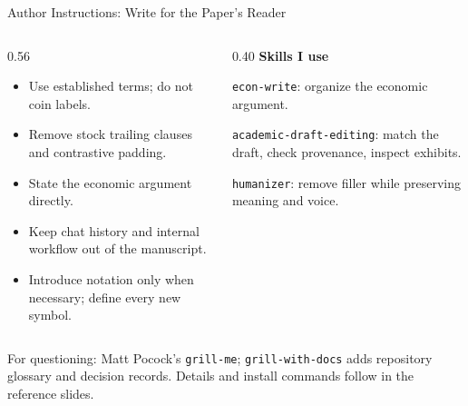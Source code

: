 \begin{frame}{Author Instructions: Write for the Paper's Reader}
\begin{columns}[t]
\begin{column}{0.56\textwidth}
\begin{itemize}\setlength{\itemsep}{0.15cm}
\item Use established terms; do not coin labels.
\item Remove stock trailing clauses and contrastive padding.
\item State the economic argument directly.
\item Keep chat history and internal workflow out of the manuscript.
\item Introduce notation only when necessary; define every new symbol.
\end{itemize}
\end{column}
\begin{column}{0.40\textwidth}
\textbf{Skills I use}
\par\vspace{0.15cm}
\texttt{econ-write}: organize the economic argument.
\par\vspace{0.2cm}
\texttt{academic-draft-editing}: match the draft, check provenance, inspect exhibits.
\par\vspace{0.2cm}
\texttt{humanizer}: remove filler while preserving meaning and voice.
\end{column}
\end{columns}
\par\vspace{0.25cm}
\small For questioning: Matt Pocock's \texttt{grill-me}; \texttt{grill-with-docs} adds repository glossary and decision records. Details and install commands follow in the reference slides.
\par\vfill
{}
\end{frame}

